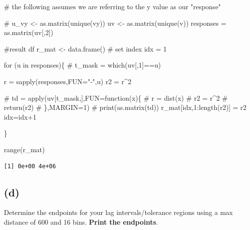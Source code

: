 \documentclass[
  letterpaper,
  DIV=11,
  numbers=noendperiod]{scrartcl}
\newenvironment{Shaded}{\begin{snugshade}}{\end{snugshade}}
\newcommand{\AttributeTok}[1]{\textcolor[rgb]{0.40,0.45,0.13}{#1}}
\newcommand{\CommentTok}[1]{\textcolor[rgb]{0.37,0.37,0.37}{#1}}
\newcommand{\ControlFlowTok}[1]{\textcolor[rgb]{0.00,0.23,0.31}{#1}}
\newcommand{\DecValTok}[1]{\textcolor[rgb]{0.68,0.00,0.00}{#1}}
\newcommand{\FunctionTok}[1]{\textcolor[rgb]{0.28,0.35,0.67}{#1}}
\newcommand{\NormalTok}[1]{\textcolor[rgb]{0.00,0.23,0.31}{#1}}
\newcommand{\OtherTok}[1]{\textcolor[rgb]{0.00,0.23,0.31}{#1}}
\newcommand{\SpecialCharTok}[1]{\textcolor[rgb]{0.37,0.37,0.37}{#1}}
\newcommand{\StringTok}[1]{\textcolor[rgb]{0.13,0.47,0.30}{#1}}
\begin{document}
\begin{Shaded}
\begin{Highlighting}[]
\CommentTok{\# the following assumes we are referring to the y value as our "response"}

\CommentTok{\# u\_vy \textless{}{-} as.matrix(unique(vy))}
\NormalTok{uv }\OtherTok{\textless{}{-}} \FunctionTok{as.matrix}\NormalTok{(}\FunctionTok{unique}\NormalTok{(v))}
\NormalTok{responses }\OtherTok{=} \FunctionTok{as.matrix}\NormalTok{(uv[,}\DecValTok{2}\NormalTok{])}

\CommentTok{\#result df}
\NormalTok{r\_mat }\OtherTok{\textless{}{-}} \FunctionTok{data.frame}\NormalTok{()}
\CommentTok{\# set index}
\NormalTok{idx }\OtherTok{=} \DecValTok{1}

\ControlFlowTok{for}\NormalTok{ (u }\ControlFlowTok{in}\NormalTok{ responses)\{}
  \CommentTok{\# t\_mask = which(uv[,1]==u)}
  
\NormalTok{  r }\OtherTok{=} \FunctionTok{sapply}\NormalTok{(responses,}\AttributeTok{FUN=}\StringTok{"{-}"}\NormalTok{,u)}
\NormalTok{  r2 }\OtherTok{=}\NormalTok{ r}\SpecialCharTok{\^{}}\DecValTok{2}
  
  \CommentTok{\# td = apply(uv[t\_mask,],FUN=function(x)\{}
  \CommentTok{\#   r = dist(x)}
  \CommentTok{\#   r2 = r\^{}2}
  \CommentTok{\#   return(r2)}
  \CommentTok{\# \},MARGIN=1)}
  \CommentTok{\# print(as.matrix(td))}
\NormalTok{  r\_mat[idx,}\DecValTok{1}\SpecialCharTok{:}\FunctionTok{length}\NormalTok{(r2)] }\OtherTok{=}\NormalTok{ r2}
\NormalTok{  idx}\OtherTok{=}\NormalTok{idx}\SpecialCharTok{+}\DecValTok{1}

\NormalTok{\}}

\FunctionTok{range}\NormalTok{(r\_mat)}
\end{Highlighting}
\end{Shaded}

\begin{verbatim}
[1] 0e+00 4e+06
\end{verbatim}

\hypertarget{d-1}{%
\subsection{(d)}\label{d-1}}

Determine the endpoints for your lag intervals/tolerance regions using a
max distance of 600 and 16 bins. \textbf{Print the endpoints}.
\end{document}
